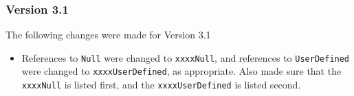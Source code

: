 \subsubsection{Version 3.1}
The following changes were made for Version 3.1

\begin{itemize}
\item References to \texttt{Null} were changed to \texttt{xxxxNull}, and references to 
\texttt{UserDefined} were changed to \texttt{xxxxUserDefined}, as appropriate. 
Also made sure that the \texttt{xxxxNull} is listed first, and the 
\texttt{xxxxUserDefined} is listed second.
\end{itemize}
